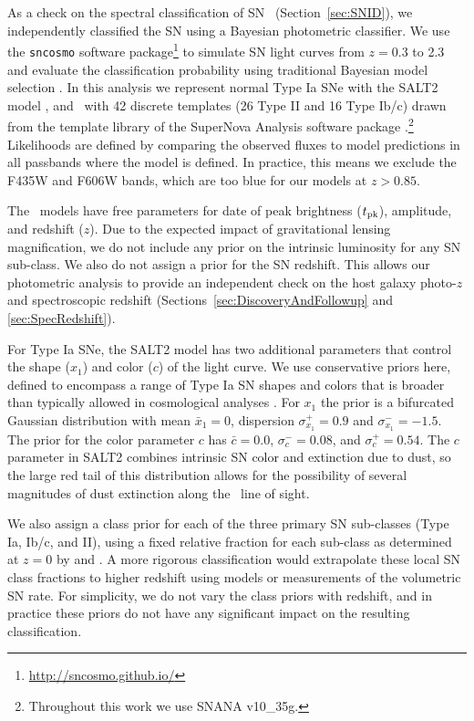 As a check on the spectral classification of SN \tomas\
(Section~\ref{sec:SNID}), we independently classified the SN using a
Bayesian photometric classifier.  We use the
{\tt sncosmo} software
package\footnote{\url{http://sncosmo.github.io/}} to simulate SN light
curves from $z=0.3$ to 2.3 and evaluate the classification
probability using traditional Bayesian model selection \citep[as
in][]{Jones:2013,Rodney:2014,Graur:2014,Rodney:2015a}.  In this
analysis we represent normal Type Ia SNe with the SALT2
model \citep{Guy:2010}, and \CCSNe\ with 42 discrete templates (26
Type II and 16 Type Ib/c) drawn from the template library of the
SuperNova Analysis software
package \citep[SNANA,][]{Kessler:2009a}.\footnote{Throughout this work
we use SNANA v10\_35g.}
Likelihoods are defined by comparing the observed fluxes to model
predictions in all passbands where the model is defined.  In practice,
this means we exclude the F435W and F606W bands, which are too blue
for our models at $z>0.85$.

The \CCSN\ models have free parameters for date of peak brightness
($t_{\rm pk}$), amplitude, and redshift ($z$). Due to the expected
impact of gravitational lensing magnification, we do not include any
prior on the intrinsic luminosity for any SN sub-class.  We also do
not assign a prior for the SN redshift. This allows our photometric
analysis to provide an independent check on the host galaxy photo-$z$
and spectroscopic redshift (Sections~\ref{sec:DiscoveryAndFollowup}
and \ref{sec:SpecRedshift}).

For Type Ia SNe, the SALT2 model has two additional parameters that
control the shape ($x_1$) and color ($c$) of the light curve.  We use
conservative priors here, defined to encompass a range of Type Ia SN
shapes and colors that is broader than typically allowed in
cosmological analyses \citep[see
e.g.,][]{Kessler:2009b,Sullivan:2011,Rest:2014}. For $x_1$ the prior is
a bifurcated Gaussian distribution with mean $\bar{x}_1=0$, dispersion
$\sigma_{x_1}^+={0.9}$ and $\sigma_{x_1}^-={-1.5}$.  The prior for the
color parameter $c$ has $\bar{c}=0.0$, $\sigma_c^-=0.08$, and
$\sigma_c^+=0.54$.  The $c$ parameter in SALT2 combines intrinsic SN
color and extinction due to dust, so the large red tail of this
distribution allows for the possibility of several magnitudes
of dust extinction along the \tomas\ line of sight.

We also assign a class prior for each of the three primary SN
sub-classes (Type Ia, Ib/c, and II), using a fixed relative fraction for
each sub-class as determined at $z=0$ by \citet{Smartt:2009}
and \citet{Li:2011a}.  A more rigorous classification would extrapolate
these local SN class fractions to higher redshift using models or
measurements of the volumetric SN rate.  For simplicity, we do not
vary the class priors with redshift, and in practice these priors do
not have any significant impact on the resulting classification.

